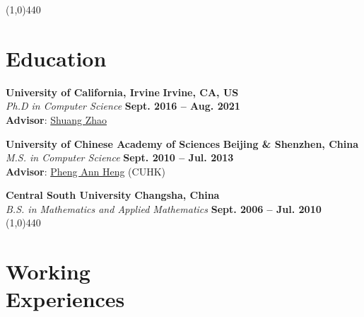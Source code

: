 \documentclass[margin,line]{resume}
\begin{document}
\begin{resume}
    \vspace{-5.0mm}
    \line(1,0){440}
    \vspace{-5.0mm}

    \section{\mysidestyle Education}
    \textbf{University of California, Irvine}       \hfill \textbf{Irvine, CA, US}  \\
    \textsl{Ph.D in Computer Science} 															\hfill \textbf{Sept. 2016 -- Aug. 2021} \\
    \textbf{Advisor}: \href{https://shuangz.com/}{Shuang Zhao} 

    \textbf{University of Chinese Academy of Sciences}  \hfill \textbf{Beijing \& Shenzhen, China}\\
    \textsl{M.S. in Computer Science}                 \hfill \textbf{Sept. 2010 -- Jul. 2013} \\
	\textbf{Advisor}: \href{http://www.cse.cuhk.edu.hk/~pheng/}{Pheng Ann Heng} (CUHK)

    \textbf{Central South University}      \hfill \textbf{Changsha, China} \\
    \textsl{B.S. in Mathematics and Applied Mathematics}                \hfill \textbf{Sept. 2006 -- Jul. 2010}  \\
    
    \vspace{-5.0mm}
    \line(1,0){440}
    \vspace{-5.0mm}

    \section{\mysidestyle Working \\Experiences}


\end{resume}
\end{document}
